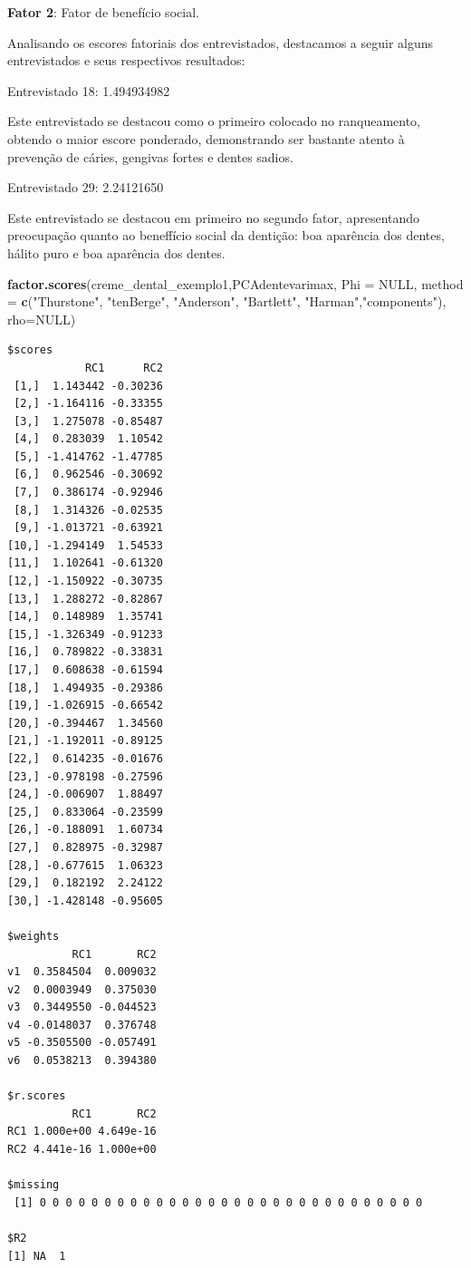 \documentclass[12pt,brazil,oneside]{book}
\newenvironment{Shaded}{\begin{snugshade}}{\end{snugshade}}
\newcommand{\DataTypeTok}[1]{\textcolor[rgb]{0.13,0.29,0.53}{#1}}
\newcommand{\KeywordTok}[1]{\textcolor[rgb]{0.13,0.29,0.53}{\textbf{#1}}}
\newcommand{\NormalTok}[1]{#1}
\newcommand{\OtherTok}[1]{\textcolor[rgb]{0.56,0.35,0.01}{#1}}
\newcommand{\StringTok}[1]{\textcolor[rgb]{0.31,0.60,0.02}{#1}}
\begin{document}
\textbf{Fator 2}: Fator de benefício social.

Analisando os escores fatoriais dos entrevistados, destacamos a seguir alguns entrevistados e seus respectivos resultados:

Entrevistado 18: 1.494934982

Este entrevistado se destacou como o primeiro colocado no ranqueamento, obtendo o maior escore ponderado, demonstrando ser bastante atento à prevenção de cáries, gengivas fortes e dentes sadios.

Entrevistado 29: 2.24121650

Este entrevistado se destacou em primeiro no segundo fator, apresentando preocupação quanto ao beneffício social da dentição: boa aparência dos dentes, hálito puro e boa aparência dos dentes.

\begin{Shaded}
\begin{Highlighting}[]
\KeywordTok{factor.scores}\NormalTok{(creme_dental_exemplo1,PCAdentevarimax, }
              \DataTypeTok{Phi =} \OtherTok{NULL}\NormalTok{, }
              \DataTypeTok{method =} \KeywordTok{c}\NormalTok{(}\StringTok{"Thurstone"}\NormalTok{, }\StringTok{"tenBerge"}\NormalTok{, }\StringTok{"Anderson"}\NormalTok{,}
                         \StringTok{"Bartlett"}\NormalTok{, }\StringTok{"Harman"}\NormalTok{,}\StringTok{"components"}\NormalTok{),}
              \DataTypeTok{rho=}\OtherTok{NULL}\NormalTok{)}
\end{Highlighting}
\end{Shaded}

\begin{verbatim}
$scores
            RC1      RC2
 [1,]  1.143442 -0.30236
 [2,] -1.164116 -0.33355
 [3,]  1.275078 -0.85487
 [4,]  0.283039  1.10542
 [5,] -1.414762 -1.47785
 [6,]  0.962546 -0.30692
 [7,]  0.386174 -0.92946
 [8,]  1.314326 -0.02535
 [9,] -1.013721 -0.63921
[10,] -1.294149  1.54533
[11,]  1.102641 -0.61320
[12,] -1.150922 -0.30735
[13,]  1.288272 -0.82867
[14,]  0.148989  1.35741
[15,] -1.326349 -0.91233
[16,]  0.789822 -0.33831
[17,]  0.608638 -0.61594
[18,]  1.494935 -0.29386
[19,] -1.026915 -0.66542
[20,] -0.394467  1.34560
[21,] -1.192011 -0.89125
[22,]  0.614235 -0.01676
[23,] -0.978198 -0.27596
[24,] -0.006907  1.88497
[25,]  0.833064 -0.23599
[26,] -0.188091  1.60734
[27,]  0.828975 -0.32987
[28,] -0.677615  1.06323
[29,]  0.182192  2.24122
[30,] -1.428148 -0.95605

$weights
          RC1       RC2
v1  0.3584504  0.009032
v2  0.0003949  0.375030
v3  0.3449550 -0.044523
v4 -0.0148037  0.376748
v5 -0.3505500 -0.057491
v6  0.0538213  0.394380

$r.scores
          RC1       RC2
RC1 1.000e+00 4.649e-16
RC2 4.441e-16 1.000e+00

$missing
 [1] 0 0 0 0 0 0 0 0 0 0 0 0 0 0 0 0 0 0 0 0 0 0 0 0 0 0 0 0 0 0

$R2
[1] NA  1
\end{verbatim}
\end{document}
